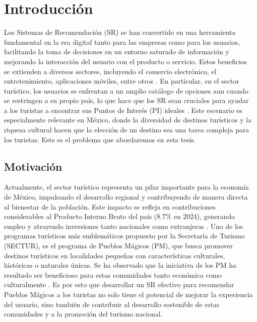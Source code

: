 \chapter{Introducción}

Los Sistemas de Recomendación (SR) se han convertido en una herramienta fundamental en la era digital tanto para las empresas como para los usuarios, facilitando la toma de decisiones en un entorno saturado de información y mejorando la interacción del usuario con el producto o servicio. Estos beneficios se extienden a diversos sectores, incluyendo el comercio electrónico, el entretenimiento, aplicaciones móviles, entre otros \citep{raza_comprehensive_2025}. En particular, en el sector turístico, los usuarios se enfrentan a un amplio catálogo de opciones aun cuando se restringen a su propio país, lo que hace que los SR sean cruciales para ayudar a los turistas a encontrar sus Puntos de Interés (PI) ideales \citep{She_Haw_Chew_2020}. Este escenario es especialmente relevante en México, donde la diversidad de destinos turísticos y la riqueza cultural hacen que la elección de un destino sea una tarea compleja para los turistas. Este es el problema que abordaremos en esta tesis.

\section{Motivación}

Actualmente, el sector turístico representa un pilar importante para la economía de México, impulsando el desarrollo regional y contribuyendo de manera directa al bienestar de la población. Este impacto se refleja en contribuciones considerables al Producto Interno Bruto del país (8.7\% en 2024), generando empleo y atrayendo inversiones tanto nacionales como extranjeras \citep{TurismoPIB_2024}. Uno de los programas turísticos más emblemáticos propuesto por la Secretaría de Turismo (SECTUR), es el programa de Pueblos Mágicos (PM), que busca promover destinos turísticos en localidades pequeñas con características culturales, históricas o naturales únicas. Se ha observado que la iniciativa de los PM ha resultado ser beneficioso para estas comunidades tanto económica como culturalmente \citep{Fernández_Poncela_2016}. Es por esto que desarrollar un SR efectivo para recomendar Pueblos Mágicos a los turistas no solo tiene el potencial de mejorar la experiencia del usuario, sino también de contribuir al desarrollo sostenible de estas comunidades y a la promoción del turismo nacional.

